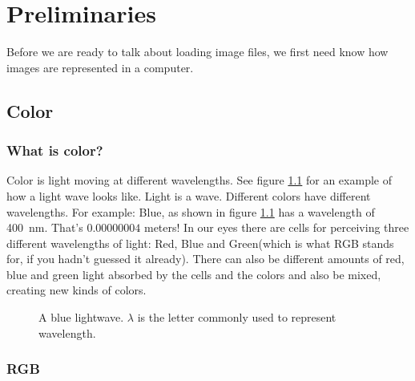 \begin{comment}
  
\end{comment}

\chapter{Preliminaries}
\label{cha:preliminaries}

Before we are ready to talk about loading image files, we first need
know how images are represented in a computer.

\section{Color}
\label{sec:color}

\subsection{What is color?}
\label{sec:what-color}

\newcommand{\bluewave}{\SI{400}{\nano\meter}}

Color is light moving at different wavelengths. See figure
\ref{fig:wave} for an example of how a light wave looks like. Light is
a wave. Different colors have different wavelengths. For example:
Blue, as shown in figure \ref{fig:wave} has a wavelength of
\bluewave. That's $0.00000004$ meters!  In our eyes there are cells
for perceiving three different wavelengths of light: Red, Blue and
Green(which is what RGB stands for, if you hadn't guessed it
already). There can also be different amounts of red, blue and green
light absorbed by the cells and the colors and also be mixed, creating
new kinds of colors. \cite{neider93:_openg_progr_guide}

\begin{figure}[h!]
  \centering
  \caption{A blue lightwave. $\lambda$ is the letter commonly used to
    represent  wavelength.}
  \label{fig:wave}
\end{figure}

\subsection{RGB}
\label{sec:rgb}

